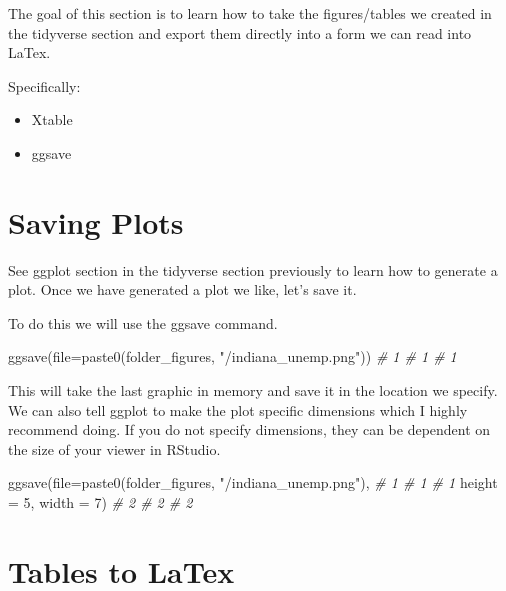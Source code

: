 \documentclass[
]{book}
\newenvironment{Shaded}{\begin{snugshade}}{\end{snugshade}}
\newcommand{\AttributeTok}[1]{\textcolor[rgb]{0.77,0.63,0.00}{#1}}
\newcommand{\CommentTok}[1]{\textcolor[rgb]{0.56,0.35,0.01}{\textit{#1}}}
\newcommand{\DecValTok}[1]{\textcolor[rgb]{0.00,0.00,0.81}{#1}}
\newcommand{\FunctionTok}[1]{\textcolor[rgb]{0.00,0.00,0.00}{#1}}
\newcommand{\NormalTok}[1]{#1}
\newcommand{\StringTok}[1]{\textcolor[rgb]{0.31,0.60,0.02}{#1}}
\providecommand{\tightlist}{%
  \setlength{\itemsep}{0pt}\setlength{\parskip}{0pt}}
\begin{document}
The goal of this section is to learn how to take the figures/tables we created in the tidyverse section and export them directly into a form we can read into LaTex.

Specifically:

\begin{itemize}
\tightlist
\item
  Xtable
\item
  ggsave
\end{itemize}

\hypertarget{saving-plots}{%
\section{Saving Plots}\label{saving-plots}}

See ggplot section in the tidyverse section previously to learn how to generate a plot. Once we have generated a plot we like, let's save it.

To do this we will use the ggsave command.

\begin{Shaded}
\begin{Highlighting}[]
\FunctionTok{ggsave}\NormalTok{(}\AttributeTok{file=}\FunctionTok{paste0}\NormalTok{(folder\_figures, }\StringTok{"/indiana\_unemp.png"}\NormalTok{))      }\CommentTok{\# 1  \# 1  \# 1}
\end{Highlighting}
\end{Shaded}

This will take the last graphic in memory and save it in the location we specify. We can also tell ggplot to make the plot specific dimensions which I highly recommend doing. If you do not specify dimensions, they can be dependent on the size of your viewer in RStudio.

\begin{Shaded}
\begin{Highlighting}[]
\FunctionTok{ggsave}\NormalTok{(}\AttributeTok{file=}\FunctionTok{paste0}\NormalTok{(folder\_figures, }\StringTok{"/indiana\_unemp.png"}\NormalTok{),   }\CommentTok{\# 1  \# 1  \# 1}
  \AttributeTok{height =} \DecValTok{5}\NormalTok{, }\AttributeTok{width =} \DecValTok{7}\NormalTok{)                                    }\CommentTok{\# 2  \# 2  \# 2}
\end{Highlighting}
\end{Shaded}

\hypertarget{tables-to-latex}{%
\section{Tables to LaTex}\label{tables-to-latex}}
\end{document}
